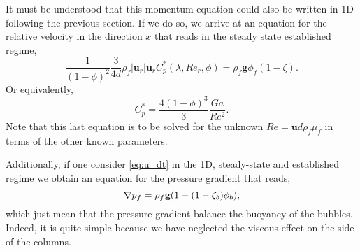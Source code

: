 It must be understood that this momentum equation could also be written in 1D following the previous section. 
If we do so, we arrive at an equation for the relative velocity in the direction $x$ that reads in the steady state established regime, 
\begin{equation}
    \frac{1}{(1-\phi)^2} \frac{3}{4d}\rho_f |\textbf{u}_r| \textbf{u}_r  C_p^*(\lambda,Re_{r},\phi)
    = 
    \rho_f \textbf{g} \phi_f (1-\zeta).
\end{equation}
Or equivalently, 
\begin{equation}
    C_p^* = \frac{4(1-\phi)^3}{3}\frac{Ga}{Re^2}.
\end{equation}
Note that this last equation is to be solved for the unknown $Re = \textbf{u} d\rho_f \mu_f $ in terms of the other known parameters. 

Additionally, if one consider  \ref{eq:u_dt} in the 1D, steady-state and established regime we obtain an equation for the pressure gradient that reads, 
\begin{equation}
    \mathbf{\nabla} p_f
    = 
    \rho_f \textbf{g} (1 - (1-\zeta_b) \phi_b),
\end{equation}
which just mean that the pressure gradient balance the buoyancy of the bubbles.
Indeed, it is quite simple because we have neglected the viscous effect on the side of the columns. 



      


